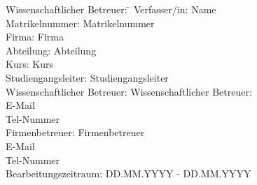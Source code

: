 \begin{titlepage}
\begin{center}
\begin{minipage}{\textwidth}
			\begin{tabbing}
				Wissenschaftlicher Betreuer: \hspace{0.85cm}\=\kill
				Verfasser/in: \> Name \\[1.5mm]
				Matrikelnummer: \> Matrikelnummer \\[1.5mm]
				Firma: \> Firma \\[1.5mm]
				Abteilung: \> Abteilung \\[1.5mm]
				Kurs: \> Kurs \\[1.5mm]
				Studiengangsleiter: \> Studiengangsleiter  \\[1.5mm]
				Wissenschaftlicher Betreuer: \> Wissenschaftlicher Betreuer: \\
				\> E-Mail \\
				\> Tel-Nummer \\[1.5mm]
				Firmenbetreuer: \> Firmenbetreuer \\
				\> E-Mail \\
				\> Tel-Nummer \\[1.5mm]
				Bearbeitungszeitraum: \> DD.MM.YYYY - DD.MM.YYYY
			\end{tabbing}
		\end{minipage}
		
	\end{center}
	
\end{titlepage}